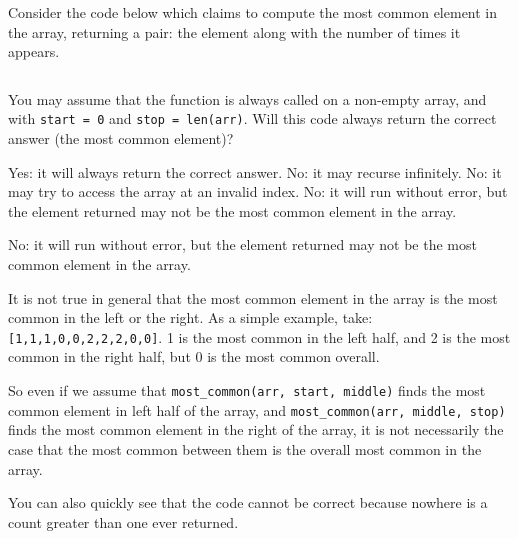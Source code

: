 \begin{prob}
    Consider the code below which claims to compute the most common
    element in the array, returning a pair: the element along with the
    number of times it appears.

    \inputminted{python}{./code.py}

    You may assume that the function is always called on a non-empty array,
    and with \texttt{start = 0} and \texttt{stop = len(arr)}.
    Will this code always return the correct answer (the most common element)?

    \begin{choices}
        \choice Yes: it will always return the correct answer.
        \choice No: it may recurse infinitely.
        \choice No: it may try to access the array at an invalid index.
        \correctchoice No: it will run without error, but the element returned may
            not be the most common element in the array.
    \end{choices}

    \begin{soln}
        No: it will run without error, but the element returned may
            not be the most common element in the array.

        It is not true in general that the most common element in the array is
        the most common in the left or the right. As a simple example, take:
        \texttt{[1,1,1,0,0,2,2,2,0,0]}.
        1 is the most common in the left half, and 2 is the most common in the right half,
        but 0 is the most common overall.

        So even if we assume that \texttt{most_common(arr, start, middle)}
        finds the most common element in left half of the array, and
        \texttt{most_common(arr, middle, stop)} finds the most common element
        in the right of the array, it is not necessarily the case that the most
        common between them is the overall most common in the array.

        You can also quickly see that the code cannot be correct because nowhere
        is a count greater than one ever returned.
    \end{soln}

\end{prob}
